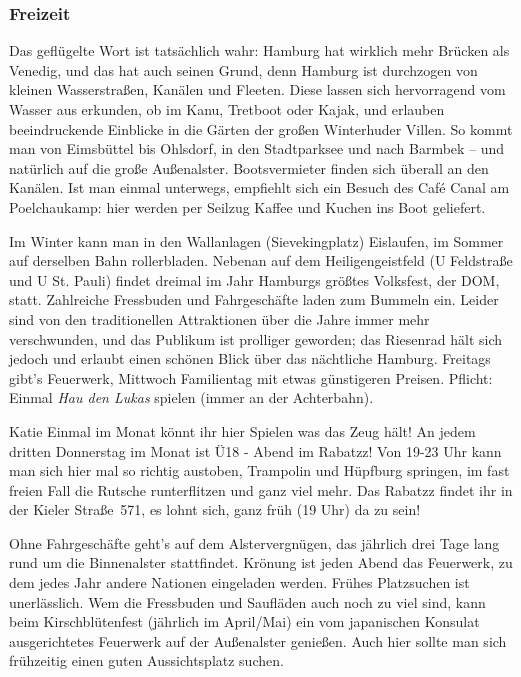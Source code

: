 \subsubsection{Freizeit}

Das geflügelte Wort ist tatsächlich wahr: Hamburg hat wirklich mehr Brücken als
Venedig, und das hat auch seinen Grund, denn Hamburg ist durchzogen von kleinen
Wasserstraßen, Kanälen und Fleeten. Diese lassen sich hervorragend vom Wasser
aus erkunden, ob im Kanu, Tretboot oder Kajak, und erlauben beeindruckende
Einblicke in die Gärten der großen Winterhuder Villen. So kommt man von
Eimsbüttel bis Ohlsdorf, in den Stadtparksee und nach Barmbek -- und natürlich
auf die große Außenalster. Bootsvermieter finden sich überall an den Kanälen.
Ist man einmal unterwegs, empfiehlt sich ein Besuch des Caf\'e Canal am
Poelchaukamp: hier werden per Seilzug Kaffee und Kuchen ins Boot geliefert.

Im Winter kann man in den Wallanlagen (Sievekingplatz) Eislaufen, im Sommer auf
derselben Bahn rollerbladen. Nebenan auf dem Heiligengeistfeld (U Feldstraße
und U St. Pauli) findet dreimal im Jahr Hamburgs größtes Volksfest, der DOM,
statt. Zahlreiche Fressbuden und Fahrgeschäfte laden zum Bummeln ein.  Leider
sind von den traditionellen Attraktionen über die Jahre immer mehr
verschwunden, und das Publikum ist prolliger geworden; das Riesenrad hält sich
jedoch und erlaubt einen schönen Blick über das nächtliche Hamburg. Freitags
gibt's Feuerwerk, Mittwoch Familientag mit etwas günstigeren Preisen. Pflicht:
Einmal \emph{Hau den Lukas} spielen (immer an der Achterbahn).

\begin{advice}{Katie}
Einmal im Monat könnt ihr hier Spielen was das Zeug hält! An jedem
dritten Donnerstag im Monat ist Ü18 - Abend im Rabatzz! Von 19-23 Uhr kann man
sich hier mal so richtig austoben, Trampolin und Hüpfburg springen, im fast
freien Fall die Rutsche runterflitzen und ganz viel mehr. Das Rabatzz findet
ihr in der Kieler Straße~571, es lohnt sich, ganz früh (19 Uhr) da zu sein!
\end{advice}

Ohne Fahrgeschäfte geht's auf dem Alstervergnügen, das jährlich drei Tage lang
rund um die Binnenalster stattfindet. Krönung ist jeden Abend das Feuerwerk, zu
dem jedes Jahr andere Nationen eingeladen werden. Frühes Platzsuchen ist
unerlässlich. Wem die Fressbuden und Saufläden auch noch zu viel sind, kann
beim Kirschblütenfest (jährlich im April/Mai) ein vom japanischen Konsulat
ausgerichtetes Feuerwerk auf der Außenalster genießen. Auch hier sollte man
sich frühzeitig einen guten Aussichtsplatz suchen.

